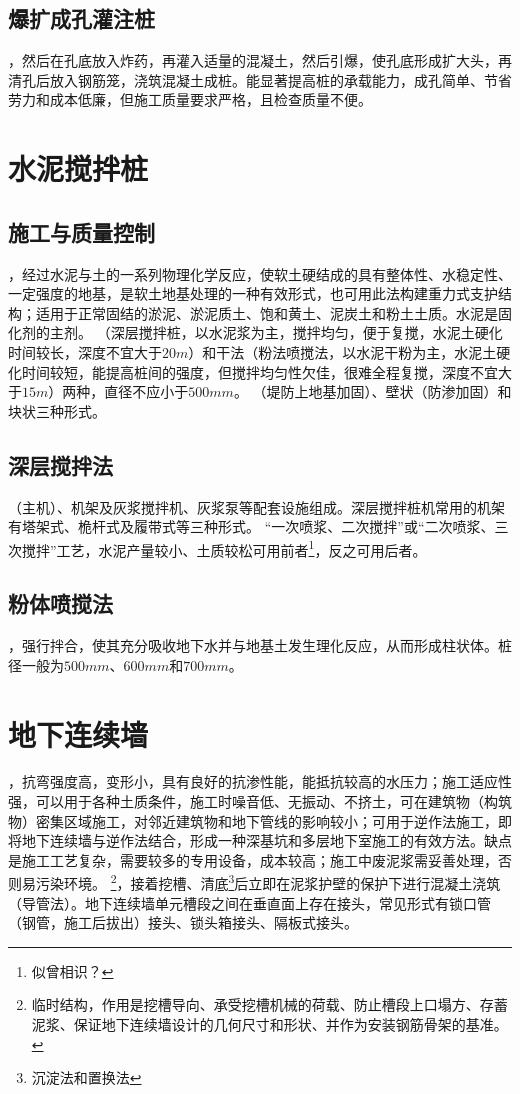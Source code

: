 \documentclass{book}
\begin{document}
\subsection{爆扩成孔灌注桩}
，然后在孔底放入炸药，再灌入适量的混凝土，然后引爆，使孔底形成扩大头，再清孔后放入钢筋笼，浇筑混凝土成桩。能显著提高桩的承载能力，成孔简单、节省劳力和成本低廉，但施工质量要求严格，且检查质量不便。
\section{水泥搅拌桩}
\subsection{施工与质量控制}
，经过水泥与土的一系列物理化学反应，使软土硬结成的具有整体性、水稳定性、一定强度的地基，是软土地基处理的一种有效形式，也可用此法构建重力式支护结构；适用于正常固结的淤泥、淤泥质土、饱和黄土、泥炭土和粉土土质。水泥是固化剂的主剂。
（深层搅拌桩，以水泥浆为主，搅拌均匀，便于复搅，水泥土硬化时间较长，深度不宜大于$20m$）和干法（粉法喷搅法，以水泥干粉为主，水泥土硬化时间较短，能提高桩间的强度，但搅拌均匀性欠佳，很难全程复搅，深度不宜大于$15m$）两种，直径不应小于$500mm$。
（堤防上地基加固）、壁状（防渗加固）和块状三种形式。
\subsection{深层搅拌法}
（主机）、机架及灰浆搅拌机、灰浆泵等配套设施组成。深层搅拌桩机常用的机架有塔架式、桅杆式及履带式等三种形式。
“一次喷浆、二次搅拌”或“二次喷浆、三次搅拌”工艺，水泥产量较小、土质较松可用前者\footnote{似曾相识？}，反之可用后者。
\subsection{粉体喷搅法}
，强行拌合，使其充分吸收地下水并与地基土发生理化反应，从而形成柱状体。桩径一般为$500mm$、$600mm$和$700mm$。
\section{地下连续墙}
，抗弯强度高，变形小，具有良好的抗渗性能，能抵抗较高的水压力；施工适应性强，可以用于各种土质条件，施工时噪音低、无振动、不挤土，可在建筑物（构筑物）密集区域施工，对邻近建筑物和地下管线的影响较小；可用于逆作法施工，即将地下连续墙与逆作法结合，形成一种深基坑和多层地下室施工的有效方法。缺点是施工工艺复杂，需要较多的专用设备，成本较高；施工中废泥浆需妥善处理，否则易污染环境。
\footnote{临时结构，作用是挖槽导向、承受挖槽机械的荷载、防止槽段上口塌方、存蓄泥浆、保证地下连续墙设计的几何尺寸和形状、并作为安装钢筋骨架的基准。}，接着挖槽、清底\footnote{沉淀法和置换法}后立即在泥浆护壁的保护下进行混凝土浇筑（导管法）。地下连续墙单元槽段之间在垂直面上存在接头，常见形式有锁口管（钢管，施工后拔出）接头、锁头箱接头、隔板式接头。
\end{document}
